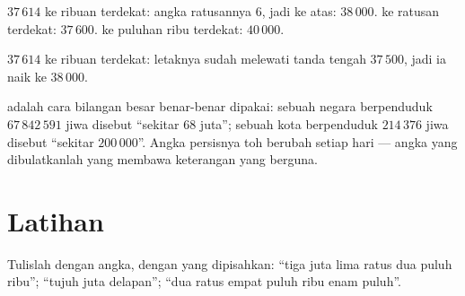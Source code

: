 \begin{example}\label{ex:g4:numbers:round}
$37\,614$  ke ribuan terdekat: angka ratusannya $6$, jadi
 ke atas: $38\,000$.  ke ratusan terdekat:
$37\,600$.  ke puluhan ribu terdekat: $40\,000$.
\end{example}

\begin{omfigure}

{\small {} $37\,614$ ke ribuan terdekat: letaknya sudah
melewati tanda tengah $37\,500$, jadi ia  naik ke $38\,000$.}
\end{omfigure}

\begin{example}\label{ex:g4:numbers:world}
 adalah cara bilangan besar benar-benar dipakai: sebuah
negara berpenduduk $67\,842\,591$ jiwa disebut ``sekitar $68$ juta'';
sebuah kota berpenduduk $214\,376$ jiwa disebut ``sekitar
$200\,000$''. Angka persisnya toh berubah setiap hari --- angka yang
dibulatkanlah yang membawa keterangan yang berguna.
\end{example}

\section{Latihan}

\begin{exercise}[$\star$]\label{exo:g4:numbers:1}
Tulislah dengan angka, dengan  yang dipisahkan: ``tiga juta
lima ratus dua puluh ribu''; ``tujuh juta delapan''; ``dua ratus
empat puluh ribu enam puluh''.
\end{exercise}

